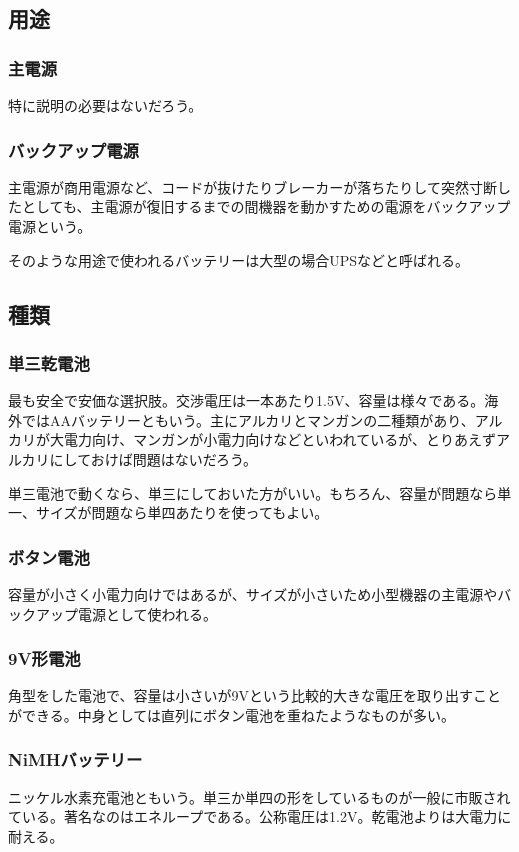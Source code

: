 \documentclass[a4paper,titlepage]{ujarticle}
\begin{document}
\subsection{用途}
\subsubsection{主電源}
特に説明の必要はないだろう。
\subsubsection{バックアップ電源}
主電源が商用電源など、コードが抜けたりブレーカーが落ちたりして突然寸断したとしても、主電源が復旧するまでの間機器を動かすための電源をバックアップ電源という。

そのような用途で使われるバッテリーは大型の場合UPSなどと呼ばれる。
\subsection{種類}
\subsubsection{単三乾電池}
最も安全で安価な選択肢。交渉電圧は一本あたり1.5V、容量は様々である。海外ではAAバッテリーともいう。主にアルカリとマンガンの二種類があり、アルカリが大電力向け、マンガンが小電力向けなどといわれているが、とりあえずアルカリにしておけば問題はないだろう。

単三電池で動くなら、単三にしておいた方がいい。もちろん、容量が問題なら単一、サイズが問題なら単四あたりを使ってもよい。
\subsubsection{ボタン電池}
容量が小さく小電力向けではあるが、サイズが小さいため小型機器の主電源やバックアップ電源として使われる。
\subsubsection{9V形電池}
角型をした電池で、容量は小さいが9Vという比較的大きな電圧を取り出すことができる。中身としては直列にボタン電池を重ねたようなものが多い。
\subsubsection{NiMHバッテリー}
ニッケル水素充電池ともいう。単三か単四の形をしているものが一般に市販されている。著名なのはエネループである。公称電圧は1.2V。乾電池よりは大電力に耐える。
\end{document}
